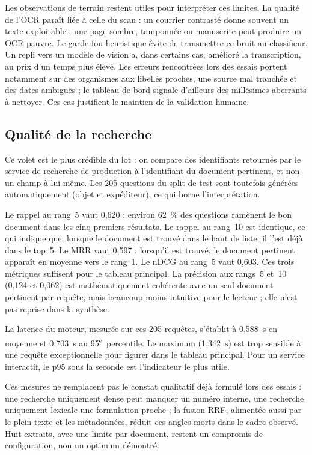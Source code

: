 Les observations de terrain restent utiles pour interpréter ces limites. La qualité de l'OCR paraît liée à celle du scan : un courrier contrasté donne souvent un texte exploitable ; une page sombre, tamponnée ou manuscrite peut produire un OCR pauvre. Le garde-fou heuristique évite de transmettre ce bruit au classifieur. Un repli vers un modèle de vision a, dans certains cas, amélioré la transcription, au prix d'un temps plus élevé. Les erreurs rencontrées lors des essais portent notamment sur des organismes aux libellés proches, une source mal tranchée et des dates ambiguës ; le tableau de bord signale d'ailleurs des millésimes aberrants à nettoyer. Ces cas justifient le maintien de la validation humaine.

\subsection{Qualité de la recherche}

Ce volet est le plus crédible du lot : on compare des identifiants retournés par le service de recherche de production à l'identifiant du document pertinent, et non un champ à lui-même. Les 205 questions du split de test sont toutefois générées automatiquement (objet et expéditeur), ce qui borne l'interprétation.

Le rappel au rang~5 vaut 0,620 : environ 62~\% des questions ramènent le bon document dans les cinq premiers résultats. Le rappel au rang~10 est identique, ce qui indique que, lorsque le document est trouvé dans le haut de liste, il l'est déjà dans le top~5. Le MRR vaut 0,597 : lorsqu'il est trouvé, le document pertinent apparaît en moyenne vers le rang~1. Le nDCG au rang~5 vaut 0,603. Ces trois métriques suffisent pour le tableau principal. La précision aux rangs~5 et~10 (0,124 et 0,062) est mathématiquement cohérente avec un seul document pertinent par requête, mais beaucoup moins intuitive pour le lecteur ; elle n'est pas reprise dans la synthèse.

La latence du moteur, mesurée sur ces 205 requêtes, s'établit à 0,588~s en moyenne et 0,703~s au 95\textsuperscript{e}~percentile. Le maximum (1,342~s) est trop sensible à une requête exceptionnelle pour figurer dans le tableau principal. Pour un service interactif, le p95 sous la seconde est l'indicateur le plus utile.

Ces mesures ne remplacent pas le constat qualitatif déjà formulé lors des essais : une recherche uniquement dense peut manquer un numéro interne, une recherche uniquement lexicale une formulation proche ; la fusion RRF, alimentée aussi par le plein texte et les métadonnées, réduit ces angles morts dans le cadre observé. Huit extraits, avec une limite par document, restent un compromis de configuration, non un optimum démontré.


